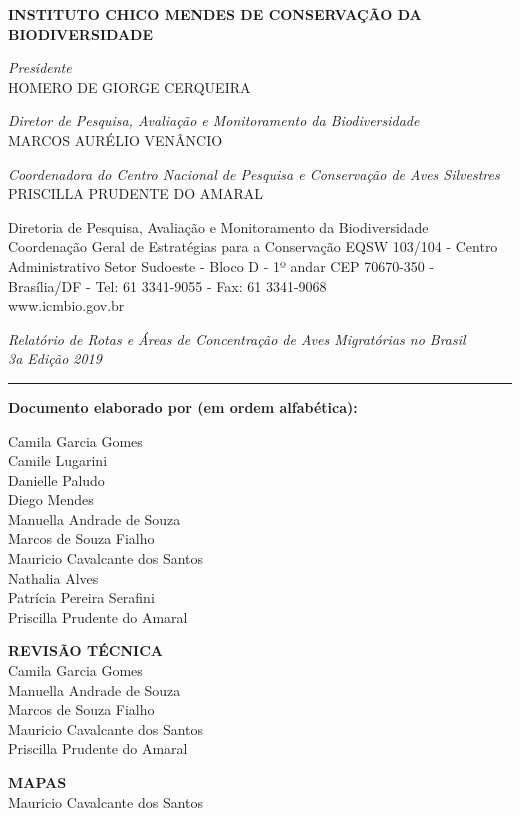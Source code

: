\documentclass[
]{scrbook}
\begin{document}
\textbf{INSTITUTO CHICO MENDES DE CONSERVAÇÃO DA BIODIVERSIDADE}

\emph{Presidente}\\
HOMERO DE GIORGE CERQUEIRA

\emph{Diretor de Pesquisa, Avaliação e Monitoramento da Biodiversidade}\\
MARCOS AURÉLIO VENÂNCIO

\emph{Coordenadora do Centro Nacional de Pesquisa e Conservação de Aves Silvestres}\\
PRISCILLA PRUDENTE DO AMARAL

Diretoria de Pesquisa, Avaliação e Monitoramento da Biodiversidade\\
Coordenação Geral de Estratégias para a Conservação
EQSW 103/104 - Centro Administrativo Setor Sudoeste - Bloco D - 1º andar
CEP 70670-350 - Brasília/DF - Tel: 61 3341-9055 - Fax: 61 3341-9068\\
www.icmbio.gov.br

\emph{Relatório de Rotas e Áreas de Concentração de Aves Migratórias no Brasil}\\
\emph{3a Edição \textbar{} 2019}

\begin{center}\rule{0.5\linewidth}{0.5pt}\end{center}

\textbf{Documento elaborado por (em ordem alfabética):}

Camila Garcia Gomes\\
Camile Lugarini\\
Danielle Paludo\\
Diego Mendes\\
Manuella Andrade de Souza\\
Marcos de Souza Fialho\\
Mauricio Cavalcante dos Santos\\
Nathalia Alves\\
Patrícia Pereira Serafini\\
Priscilla Prudente do Amaral

\textbf{REVISÃO TÉCNICA}\\
Camila Garcia Gomes\\
Manuella Andrade de Souza\\
Marcos de Souza Fialho\\
Mauricio Cavalcante dos Santos\\
Priscilla Prudente do Amaral

\textbf{MAPAS}\\
Mauricio Cavalcante dos Santos
\end{document}
